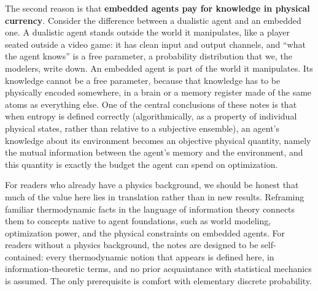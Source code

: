 \documentclass[10pt]{article}
\theoremstyle{definition}
\theoremstyle{remark}
\begin{document}
The second reason is that \textbf{embedded agents pay for knowledge in physical currency}. Consider the difference between a dualistic agent and an embedded one. A dualistic agent stands outside the world it manipulates, like a player seated outside a video game: it has clean input and output channels, and ``what the agent knows'' is a free parameter, a probability distribution that we, the modelers, write down. An embedded agent is part of the world it manipulates. Its knowledge cannot be a free parameter, because that knowledge has to be physically encoded somewhere, in a brain or a memory register made of the same atoms as everything else. One of the central conclusions of these notes is that when entropy is defined correctly (algorithmically, as a property of individual physical states, rather than relative to a subjective ensemble), an agent's knowledge about its environment becomes an objective physical quantity, namely the mutual information between the agent's memory and the environment, and this quantity is exactly the budget the agent can spend on optimization.

For readers who already have a physics background, we should be honest that much of the value here lies in translation rather than in new results. Reframing familiar thermodynamic facts in the language of information theory connects them to concepts native to agent foundations, such as world modeling, optimization power, and the physical constraints on embedded agents. For readers without a physics background, the notes are designed to be self-contained: every thermodynamic notion that appears is defined here, in information-theoretic terms, and no prior acquaintance with statistical mechanics is assumed. The only prerequisite is comfort with elementary discrete probability.
\end{document}
